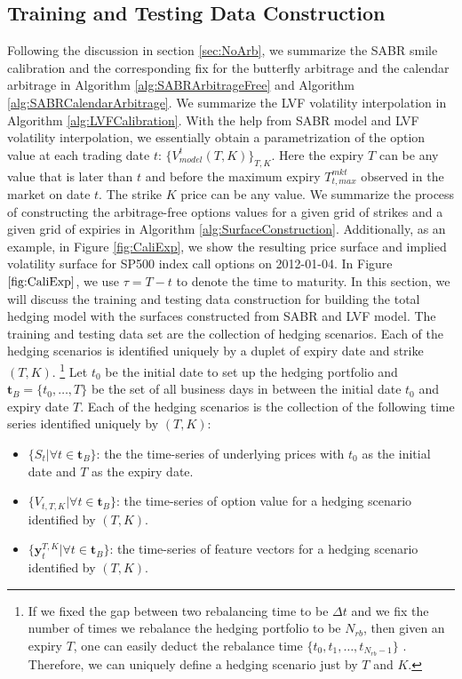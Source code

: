 \documentclass[letterpaper,12pt,titlepage,oneside,final]{book}
\numberwithin{equation}{section}
\theoremstyle{definition}
\newcommand{\vy}{\mathbf{y}}
\newcommand{\DT}{\Delta t}
\begin{document}
\iffalse



\subsection{Training and Testing Data Construction}
\label{sec:Augtrain}
Following the discussion in section \ref{sec:NoArb}, we summarize the SABR smile calibration and the corresponding fix for the butterfly arbitrage and the calendar arbitrage in Algorithm \ref{alg:SABRArbitrageFree} and Algorithm \ref{alg:SABRCalendarArbitrage}. We summarize the LVF volatility interpolation in Algorithm \ref{alg:LVFCalibration}. With the help from SABR model and LVF volatility interpolation, we essentially obtain a parametrization of the option value at each trading date $t$: $\{V^{t}_{model}(T,K)\}_{T,K}$. Here the expiry $T$  can be any value that is later than $t$ and before  the maximum expiry $T_{t,max}^{mkt}$ observed in the market on date $t$. The strike $K$ price can be any  value. We summarize the process of constructing the arbitrage-free options values for a given grid of strikes and a given grid of expiries in Algorithm \ref{alg:SurfaceConstruction}. Additionally, as an example, in Figure \ref{fig:CaliExp}, we show the resulting price surface and implied  volatility surface for SP500 index call options  on 2012-01-04. In Figure $\ref{fig:CaliExp}$, we use $\tau=T-t$ to denote the time to maturity.  
In this section, we will discuss the training and testing data construction for building the total hedging model with the surfaces constructed from SABR and LVF model. The training and testing data set are the collection of hedging scenarios. Each of the hedging scenarios is identified uniquely by a duplet of expiry date and strike  $(T,K)$. \footnote{ If we fixed the gap between two rebalancing time to be $\DT$ and we fix the number of times we rebalance the hedging portfolio to be $N_{rb}$, then given an expiry $T$, one can easily deduct the rebalance time $\{t_0,t_1, \dots, t_{N_{rb}-1}\}$ . Therefore, we can uniquely define a hedging scenario just by $T$ and $K$.} Let $t_0$ be the initial date to set up the hedging portfolio and $\mathbf{t}_B=\{t_0,\dots,T\}$ be the set of all business days in between the initial date $t_0$ and expiry date $T$.  Each of the hedging scenarios is the collection of the following time series identified uniquely by $(T,K)$:
\begin{itemize}
	\item $\{S_t|\forall t \in \mathbf{t}_B \}$: the the time-series of underlying prices  with $t_0$ as the initial date and $T$ as the expiry date.
	\item $\{V_{t,T,K}|\forall t \in \mathbf{t}_B\}$:  the time-series of option value for a hedging scenario identified by $(T,K)$.
	\item $\{\vy^{T,K}_{t}|\forall t \in \mathbf{t}_B\}$: the time-series of feature vectors for a hedging scenario identified by $(T,K)$.
\end{itemize}
\end{document}
